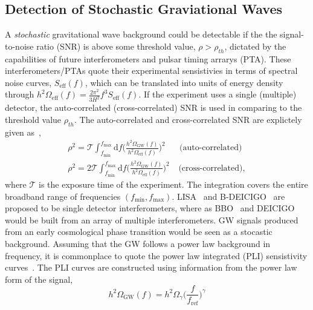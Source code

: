 \documentclass[nofootinbib,twocolumn,preprintnumbers]{revtex4-1}
\begin{document}
\subsection{Detection of Stochastic Graviational Waves}
\label{sec:detection}
A \textit{stochastic} gravitational wave background could be detectable if the the signal-to-noise ratio (SNR) is above some threshold value, $\rho > \rho_{th}$, dictated by the capabilities of future interferometers and pulsar timing arrarys (PTA). These interferometers/PTAs quote their experimental sensistivies in terms of spectral noise curves, $S_{\textrm{eff}}(f)$, which can be translated into units of energy density through $h^2 \Omega_{\textrm{eff}}(f) = \frac{2\pi^2}{3H^2}f^3 S_{\textrm{eff}}(f)$. If the experiment uses a single (multiple) detector, the auto-correlated (cross-correlated) SNR is used in comparing to the threshold value $\rho_{th}$. The auto-correlated and cross-correlated SNR are explictely given as~\cite{PhysRevD.59.102001},
\begin{equation}\label{eqn::SNR}
\begin{split}
\rho^2 =  \mathcal{T} \int_{f_{\textrm{min}}}^{f_{\textrm{max}}}\textrm{d}f \bigg( \frac{h^2 \Omega_{\textrm{GW}}(f)}{h^2 \Omega_{\textrm{eff}}(f)} \bigg)^2 \;\;\;\;\;\; \textrm{(auto-correlated)}
\\
\rho^2 = 2 \mathcal{T} \int_{f_{\textrm{min}}}^{f_{\textrm{max}}}\textrm{d}f \bigg( \frac{h^2 \Omega_{\textrm{GW}}(f)}{h^2 \Omega_{\textrm{eff}}(f)} \bigg)^2 \;\;\;\: \textrm{(cross-correlated)},
\end{split}
\end{equation}
where $\mathcal{T}$ is the exposure time of the experiment. The integration covers the entire broadband range of frequencies $(f_{\textrm{min}}, f_{\textrm{max}})$. LISA~\citep{Audley:2017drz} and B-DEICIGO~\citep{10.1093/ptep/pty078} are proposed to be single detector interferometers, where as BBO~\citep{PhysRevD.72.083005} and DEICIGO~\citep{Sato_2017} would be built from an array of multiple interferometers.
GW signals produced from an early cosmological phase transition would be seen as a stocastic background. Assuming that the GW follows a power law background in frequency, it is commonplace to quote the power law integrated (PLI) sensistivity curves~\cite{PhysRevD.88.124032}. The PLI curves are constructed using information from the power law form of the signal,
\begin{equation}\label{eqn::PowerLaw}
h^2 \Omega_{\textrm{GW}}(f) = h^2 \Omega_{\gamma}  \bigg(\frac{f}{f_{\textrm{ref}}}\bigg)^{\gamma}
\end{equation}
\end{document}
